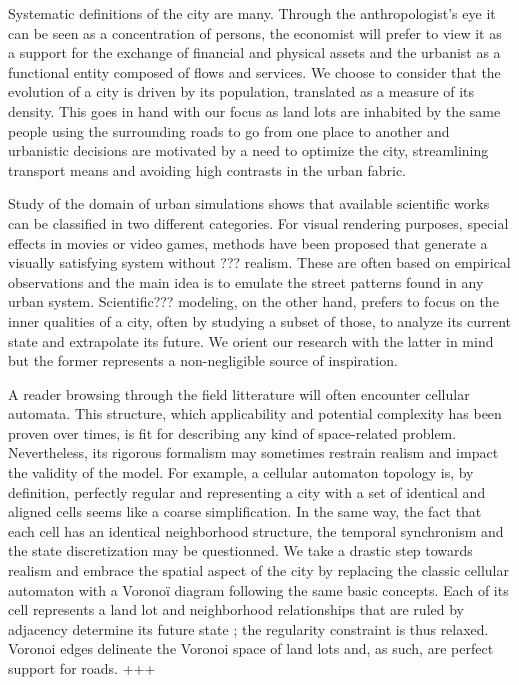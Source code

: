 \documentclass[12pt]{article}
\begin{document}
Systematic definitions of the city are many. Through the
anthropologist's eye it can be seen as a concentration of persons, the
economist will prefer to view it as a support for the exchange of
financial and physical assets and the urbanist as a functional entity
composed of flows and services. We choose to consider that the
evolution of a city is driven by its population, translated as a
measure of its density. This goes in hand with our focus as land lots
are inhabited by the same people using the surrounding roads to go
from one place to another and urbanistic decisions are motivated by a
need to optimize the city, streamlining transport means and avoiding
high contrasts in the urban fabric.

Study of the domain of urban simulations shows that available
scientific works can be classified in two different categories. For
visual rendering purposes, special effects in movies or video games,
methods have been proposed that generate a visually satisfying system
without ??? realism. These are often based on empirical observations
and the main idea is to emulate the street patterns found in any urban
system. Scientific??? modeling, on the other hand, prefers to focus on
the inner qualities of a city, often by studying a subset of those, to
analyze its current state and extrapolate its future. We orient our
research with the latter in mind but the former represents a
non-negligible source of inspiration.

A reader browsing through the field litterature will often encounter
cellular automata. This structure, which applicability and potential
complexity has been proven over times, is fit for describing any kind
of space-related problem. Nevertheless, its rigorous formalism may
sometimes restrain realism and impact the validity of the model. For
example, a cellular automaton topology is, by definition, perfectly
regular and representing a city with a set of identical and aligned
cells seems like a coarse simplification. In the same way, the fact
that each cell has an identical neighborhood structure, the temporal
synchronism and the state discretization may be questionned. We take a
drastic step towards realism and embrace the spatial aspect of the
city by replacing the classic cellular automaton with a Voronoï
diagram following the same basic concepts. Each of its cell represents
a land lot and neighborhood relationships that are ruled by adjacency
determine its future state ; the regularity constraint is thus
relaxed. Voronoi edges delineate the Voronoi space of land lots and,
as such, are perfect support for roads. +++
\end{document}
